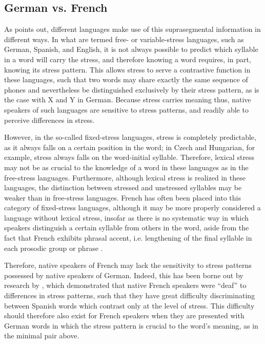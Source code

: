 		
		\subsection{German vs. French}
		\label{sec:stress:GvF}
		
					As \textcite{Cutler2005} points out, different languages make use of this suprasegmental information in different ways. 
			In what are termed free- or variable-stress languages, such as German, Spanish, and English, it is not always possible to predict which syllable in a word will carry the stress, and therefore knowing a word requires, in part, knowing its stress pattern. This allows stress to serve a contrastive function in these languages, such that two words may share exactly the same sequence of phones and nevertheless be distinguished exclusively by their stress pattern, as is the case with X and Y in German. %
Because stress carries meaning thus, native speakers of such languages are sensitive to stress patterns, and readily able to perceive differences in stress. %

			However, in the so-called fixed-stress languages, stress is completely predictable, as it always falls on a certain position in the word; in Czech and Hungarian, for example, stress always falls on the word-initial syllable. Therefore, lexical stress may not be as crucial to the knowledge of a word in these languages as in the free-stress languages. Furthermore, although lexical stress is realized in these languages, the distinction between stressed and unstressed syllables may be weaker than in free-stress languages. French has often been placed into this category of fixed-stress languages, although it may be more properly considered a language without lexical stress, insofar as there is no systematic way in which speakers distinguish a certain syllable from others in the word, aside from the fact that French exhibits phrasal accent, i.e. lengthening of the final syllable in each prosodic group or phrase \citep{Dupoux2008}. %
			
		Therefore, native speakers of French may lack the sensitivity to stress patterns possessed by native speakers of German. Indeed, this has been borne out by research by \citeauthor{Dupoux2008} \citep{Peperkamp2002,Dupoux2001,Dupoux2008}, which demonstrated that native French speakers were ``deaf'' to differences in stress patterns, such that they have great difficulty discriminating between Spanish words which contrast only at the level of stress. This difficulty should therefore also exist for French speakers when they are presented with German words in which the stress pattern is crucial to the word's meaning, as in the minimal pair above.
		
